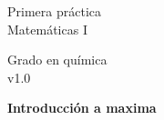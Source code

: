 \documentclass{article}
\title{\tit}
\author{}
\date{}
\def\tit{Introducción a maxima}
\begin{document}
\noindent\begin{minipage}{.4\textwidth}
\large
Primera práctica\\
Matemáticas I
\end{minipage}
\hfill
\begin{minipage}{.4\textwidth}
\large
\flushright
Grado en química\\
v1.0
\end{minipage}

\bigskip

\begin{center}
\textbf{
\huge
\tit
}
\end{center}










\end{document}
